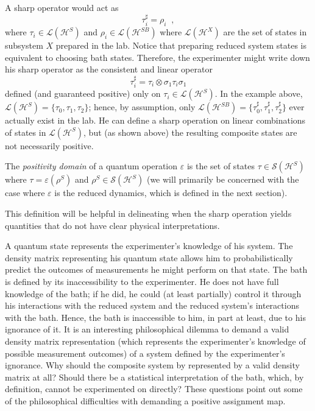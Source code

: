 A sharp operator would act as
$$
\tau_i^\sharp = \rho_i\;\;,
$$
where $\tau_i\in\mathcal{L}(\mathcal{H}^S)$ and $\rho_i\in\mathcal{L}(\mathcal{H}^{SB})$ where $\mathcal{L}(\mathcal{H}^X)$ are the set of states in subsystem $X$ prepared in the lab.  Notice that preparing reduced system states is equivalent to choosing bath states.  Therefore, the experimenter might write down his sharp operator as the consistent and linear operator
$$
\tau_i^\sharp = \tau_i \otimes \sigma_1\tau_i\sigma_1
$$
defined (and guaranteed positive) only on $\tau_i\in\mathcal{L}(\mathcal{H}^S)$.  In the example above, $\mathcal{L}(\mathcal{H}^S) = \{\tau_0,\tau_1,\tau_2\}$; hence, by assumption, only $\mathcal{L}(\mathcal{H}^{SB}) = \{\tau_0^\sharp,\tau_1^\sharp,\tau_2^\sharp\}$ ever actually exist in the lab.  He can define a sharp operation on linear combinations of states in $\mathcal{L}(\mathcal{H}^S)$, but (as shown above) the resulting composite states are not necessarily positive. 
\begin{definition}
The {\em positivity domain} of a quantum operation $\varepsilon$ is the set of states $\tau\in\mathcal{S}(\mathcal{H}^S)$ where $\tau=\varepsilon(\rho^S)$ and $\rho^S \in\mathcal{S}(\mathcal{H}^S)$ (we will primarily be concerned with the case where  $\varepsilon$ is the reduced dynamics, which is defined in the next section).
\end{definition} 

This definition will be helpful in delineating when the sharp operation yields quantities that do not have clear physical interpretations. 

A quantum state represents the experimenter's knowledge of his system.  The density matrix representing his quantum state allows him to probabilistically predict the outcomes of measurements he might perform on that state.  The bath is defined by its inaccessibility to the experimenter.  He does not have full knowledge of the bath; if he did, he could (at least partially) control it through his interactions with the reduced system and the reduced system's interactions with the bath.  Hence, the bath is inaccessible to him, in part at least, due to his ignorance of it.  It is an interesting philosophical dilemma to demand a valid density matrix representation (which represents the experimenter's knowledge of possible measurement outcomes) of a system defined by the experimenter's ignorance.  Why should the composite system by represented by a valid density matrix at all?  Should there be a statistical interpretation of the bath, which, by definition, cannot be experimented on directly?  These questions point out some of the philosophical difficulties with demanding a positive assignment map.

